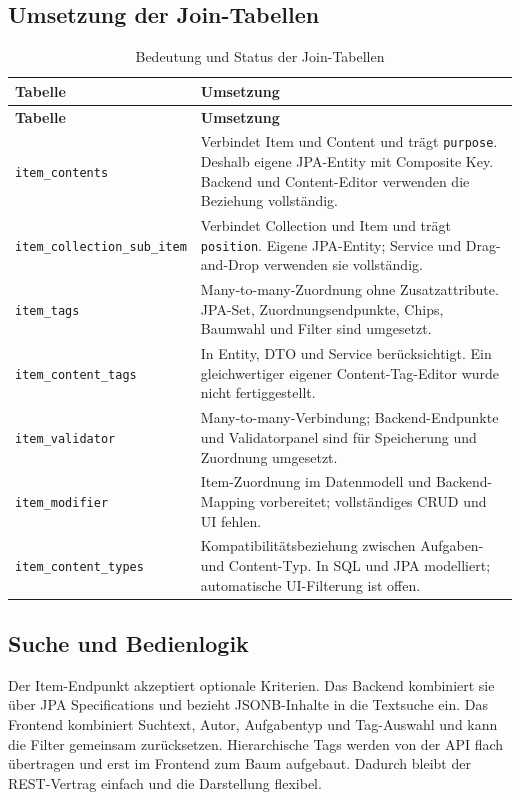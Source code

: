 ﻿\documentclass[11pt,a4paper]{article}
\begin{document}
\subsection{Umsetzung der Join-Tabellen}
\begin{longtable}{@{}p{.25\linewidth}p{.69\linewidth}@{}}
\caption{Bedeutung und Status der Join-Tabellen}\label{tab:joins}\\
\toprule
\textbf{Tabelle}&\textbf{Umsetzung}\\\midrule
\endfirsthead
\toprule
\textbf{Tabelle}&\textbf{Umsetzung}\\\midrule
\endhead
\texttt{item\_contents}&Verbindet Item und Content und trägt
\texttt{purpose}. Deshalb eigene JPA-Entity mit Composite Key. Backend und
Content-Editor verwenden die Beziehung vollständig.\\
\texttt{item\_\allowbreak collection\_\allowbreak sub\_\allowbreak item}&Verbindet Collection und Item und trägt
\texttt{position}. Eigene JPA-Entity; Service und Drag-and-Drop verwenden sie
vollständig.\\
\texttt{item\_tags}&Many-to-many-Zuordnung ohne Zusatzattribute. JPA-Set,
Zuordnungsendpunkte, Chips, Baumwahl und Filter sind umgesetzt.\\
\texttt{item\_content\_tags}&In Entity, DTO und Service berücksichtigt.
Ein gleichwertiger eigener Content-Tag-Editor wurde nicht fertiggestellt.\\
\texttt{item\_validator}&Many-to-many-Verbindung; Backend-Endpunkte und
Validatorpanel sind für Speicherung und Zuordnung umgesetzt.\\
\texttt{item\_modifier}&Item-Zuordnung im Datenmodell und Backend-Mapping
vorbereitet; vollständiges CRUD und UI fehlen.\\
\texttt{item\_content\_types}&Kompatibilitätsbeziehung zwischen Aufgaben- und
Content-Typ. In SQL und JPA modelliert; automatische UI-Filterung ist offen.\\
\bottomrule
\end{longtable}

\subsection{Suche und Bedienlogik}
Der Item-Endpunkt akzeptiert optionale Kriterien. Das Backend kombiniert sie
über JPA Specifications und bezieht JSONB-Inhalte in die Textsuche ein. Das
Frontend kombiniert Suchtext, Autor, Aufgabentyp und Tag-Auswahl und kann die
Filter gemeinsam zurücksetzen. Hierarchische Tags werden von der API flach
übertragen und erst im Frontend zum Baum aufgebaut. Dadurch bleibt der
REST-Vertrag einfach und die Darstellung flexibel.
\end{document}
